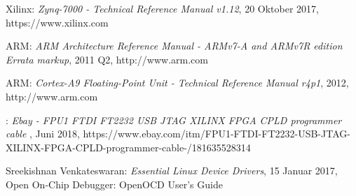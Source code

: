 \begingroup
\renewcommand{\chapter}[2]{\section#1{#2}}%
\begin{thebibliography}{99}




	Xilinx:
	\emph{Zynq-7000 - Technical Reference Manual v1.12},
	20 Oktober 2017, https://www.xilinx.com

	ARM:
	\emph{ARM Architecture Reference Manual - ARMv7-A and ARMv7R edition Errata markup},
	2011 Q2, http://www.arm.com

	ARM:
	\emph{Cortex-A9 Floating-Point Unit - Technical Reference Manual r4p1},
	2012, http://www.arm.com


	:
	\emph{Ebay - FPU1 FTDI FT2232 USB JTAG XILINX FPGA CPLD programmer cable },
	Juni 2018, https://www.ebay.com/itm/FPU1-FTDI-FT2232-USB-JTAG-XILINX-FPGA-CPLD-programmer-cable-/181635528314
	
	Sreekishnan Venkateswaran:
	\emph{Essential Linux Device Drivers},
	15 Januar 2017, Open On-Chip Debugger: OpenOCD User's Guide









	\end{thebibliography}
\endgroup